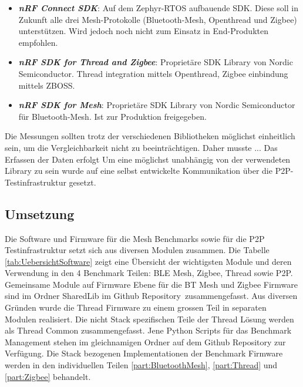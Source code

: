 \begin{itemize}
	\item \textit{\textbf{nRF Connect SDK}}: Auf dem Zephyr-RTOS aufbauende SDK. Diese soll in Zukunft alle drei Mesh-Protokolle (Bluetooth-Mesh, Openthread und Zigbee) unterstützen. Wird jedoch noch nicht zum Einsatz in End-Produkten empfohlen. \cite{nordic_semi_welcome_to_the_nrf_connect_sdk_2020}
	\item \textit{\textbf{nRF SDK for Thread and Zigbee}}: Proprietäre SDK Library von Nordic Semiconductor. Thread integration mittels Openthread, Zigbee einbindung mittels ZBOSS. \cite{nordic_semi_nrf_sdk_for_thread_and_zigbee_2020}
	\item \textit{\textbf{nRF SDK for Mesh}}: Proprietäre SDK Library von Nordic Semiconductor für Bluetooth-Mesh. Ist zur Produktion freigegeben. \cite{nordic_semi_nrf_sdk_for_mesh_2020}
\end{itemize}

Die Messungen sollten trotz der verschiedenen Bibliotheken möglichst einheitlich sein, um die Vergleichbarkeit nicht zu beeinträchtigen. Daher musste ... Das Erfassen der Daten erfolgt Um eine möglichst unabhängig von der verwendeten Library zu sein wurde auf eine selbst entwickelte Kommunikation über die P2P-Testinfrastruktur gesetzt. 






\subsection{Umsetzung}\label{subsec:Software_Umsetzung}




Die Software und Firmware für die Mesh Benchmarks sowie für die P2P Testinfrastruktur setzt sich aus diversen Modulen zusammen. Die Tabelle \ref{tab:UebersichtSoftware} zeigt eine Übersicht der wichtigsten Module und deren Verwendung in den 4 Benchmark Teilen: BLE Mesh, Zigbee, Thread sowie P2P.
Gemeinsame Module auf Firmware Ebene für die BT Mesh und Zigbee Firmware sind im Ordner SharedLib im Github Repository\footnotemark\ zusammengefasst. Aus diversen Gründen wurde die Thread Firmware zu einem grossen Teil in separaten Modulen realisiert. Die nicht Stack spezifischen Teile der Thread Lösung werden als Thread Common zusammengefasst.
Jene Python Scripts für das Benchmark Management stehen im gleichnamigen Ordner auf dem Github Repository zur Verfügung.
Die Stack bezogenen Implementationen der Benchmark Firmware werden in den individuellen Teilen \ref{part:BluetoothMesh}, \ref{part:Thread} und \ref{part:Zigbee} behandelt.


